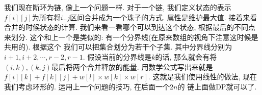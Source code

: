  我们现在断环为链, 像上一个问题一样. 对于一个链, 我们定义状态的表示
$f[i][j]$为所有将$i..j$区间合并成为一个珠子的方式. 属性是维护最大值. 接着来看
合并的时候状态的计算. 我们来看一看哪个可以到达这个状态, 根据最后的不同点来划分. 
这个和上一个是类似的: 有一个分界线(在原来数组的视角下注意这时候是共用的). 根据这个
我们可以把集合划分为若干个子集. 其中分界线分别为$i+1, i+2, \cdots, r-2, r-1$.
假设当前的分界线是$k$的话, 那么就会有将$(i, k), (k, j)$最后将两个合并释放的能量. 
用数学公式写出来就是$f[i][k] + f[k][j] + w[l]\times w[k]\times w[r]$. 
这就是我们使用线性的做法, 现在我们考虑环形的. 运用上一个问题的技巧, 在后面一个$2n$的
链上面做DP就可以了. 


